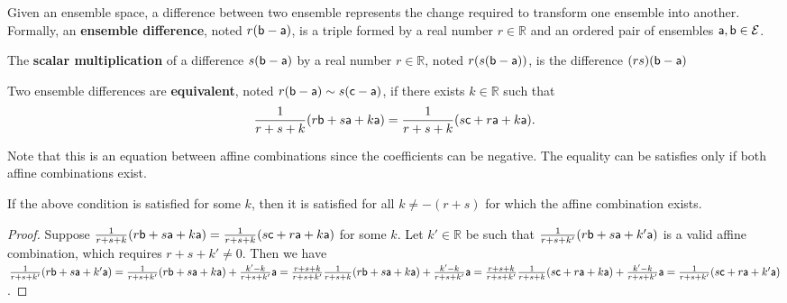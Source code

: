 \begin{mathSection}
	
	\begin{defn}
		Given an ensemble space, a difference between two ensemble represents the change required to transform one ensemble into another. Formally, an \textbf{ensemble difference}, noted $r(\ens[b] - \ens[a])$, is a triple formed by a real number $r \in \mathbb{R}$ and an ordered pair of ensembles $\ens[a],\ens[b] \in \Ens$.
	\end{defn}
	
	\begin{defn}
		The \textbf{scalar multiplication} of a difference $s(\ens[b] - \ens[a])$ by a real number $r \in \mathbb{R}$, noted $r(s(\ens[b] - \ens[a]))$, is the difference $(rs)(\ens[b] - \ens[a])$
	\end{defn}
	
	\begin{defn}
		Two ensemble differences are \textbf{equivalent}, noted $r(\ens[b] - \ens[a]) \sim s(\ens[c] - \ens[a])$, if there exists $k \in \mathbb{R}$ such that
		$$ \frac{1}{r+s+k} (r \ens[b] + s \ens[a] + k \ens[a]) = \frac{1}{r+s+k} (s \ens[c] + r \ens[a] + k \ens[a]).$$
	\end{defn}
	
	\begin{remark}
		Note that this is an equation between affine combinations since the coefficients can be negative. The equality can be satisfies only if both affine combinations exist.
	\end{remark}
	
	\begin{coro}
		If the above condition is satisfied for some $k$, then it is satisfied for all $k \neq -(r+s)$ for which the affine combination exists.
	\end{coro}
	
	\begin{proof}
		Suppose $\frac{1}{r+s+k} (r \ens[b] + s \ens[a] + k \ens[a]) = \frac{1}{r+s+k} (s \ens[c] + r \ens[a] + k \ens[a])$ for some $k$. Let $k' \in \mathbb{R}$ be such that $\frac{1}{r+s+k'} (r \ens[b] + s \ens[a] + k' \ens[a])$ is a valid affine combination, which requires $r+s+k'\neq0$. Then we have $\frac{1}{r+s+k'} (r \ens[b] + s \ens[a] + k' \ens[a]) = \frac{1}{r+s+k'} (r \ens[b] + s \ens[a] + k \ens[a]) + \frac{k'-k}{r+s+k'} \ens[a] = \frac{r+s+k}{r+s+k'} \frac{1}{r+s+k}(r \ens[b] + s \ens[a] + k \ens[a]) + \frac{k'-k}{r+s+k'} \ens[a] = \frac{r+s+k}{r+s+k'} \frac{1}{r+s+k}(s \ens[c] + r \ens[a] + k \ens[a]) + \frac{k'-k}{r+s+k'} \ens[a] = \frac{1}{r+s+k'} (s \ens[c] + r \ens[a] + k' \ens[a])$.
	\end{proof}
	

\end{mathSection}
